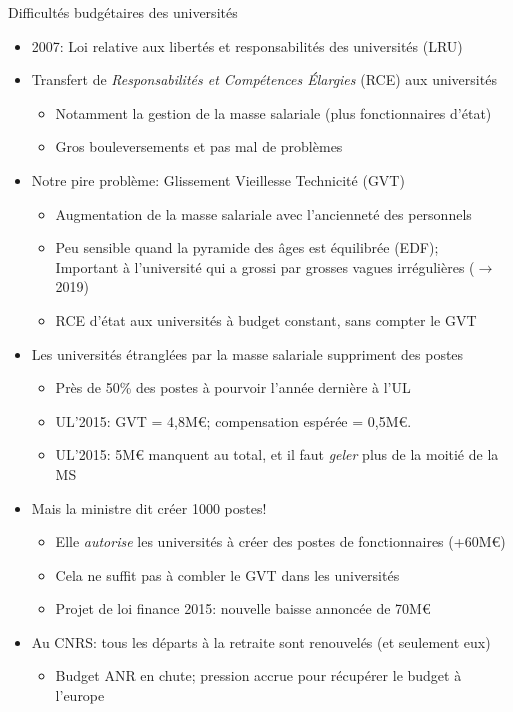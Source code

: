 \documentclass[10pt,final,usepdftitle=false]{beamer}
\begin{document}
\begin{frame}{Difficultés budgétaires des universités} 
\begin{itemize}
\item 2007: Loi relative aux libertés et responsabilités des universités (LRU)
\item Transfert de \textsl{Responsabilités et Compétences Élargies} (RCE) aux
  universités
  \begin{itemize}
  \item Notamment la gestion de la masse salariale (plus fonctionnaires d'état)
  \item Gros bouleversements et pas mal de problèmes
  \end{itemize}

\item Notre pire problème: \alert{Glissement Vieillesse Technicité (GVT)}
  \begin{itemize}
  \item Augmentation de la masse salariale avec l'ancienneté des personnels
  \item Peu sensible quand la pyramide des âges est équilibrée (EDF);\\
    Important à l'université qui a grossi par grosses vagues irrégulières
    ($\rightarrow$2019)
  \item RCE d'état aux universités à \alert{budget constant},
    sans compter le GVT
  \end{itemize}

\pause
\item Les universités étranglées par la masse salariale suppriment des postes
  \begin{itemize}
  \item Près de 50\% des postes à pourvoir l'année dernière à l'UL
  \item UL'2015: GVT = 4,8M\euro{}; compensation espérée = 0,5M\euro{}.
  \item UL'2015: 5M\euro{} manquent au total, et il faut \textit{geler} plus de
    la moitié de la MS
  \end{itemize}
\pause
\item Mais la ministre dit créer 1000 postes!
  \begin{itemize}
  \item Elle \textit{autorise} les universités à créer des postes de
    fonctionnaires (+60M\euro)
  \item Cela ne suffit pas à combler le GVT dans les universités
  \item Projet de loi finance 2015: nouvelle baisse annoncée de 70M\euro{}
  \end{itemize}
\pause
\item Au CNRS: tous les départs à la retraite sont renouvelés (et seulement eux)
  \begin{itemize}
  \item Budget ANR en chute; pression accrue pour récupérer le budget à l'europe
  \end{itemize}
\end{itemize}
\end{frame}
\end{document}

